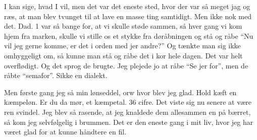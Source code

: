 \documentclass[a4paper,11pt]{article}
\begin{document}
\begin{sketch}
I kan sige, hvad I vil, men det var det eneste sted, hvor der var så
meget jag og ræs, at man blev tvunget til at lave en masse ting
samtidigt.  Men ikke nok med det.  Dad. 1 var så bange for, at vi
skulle støde sammen, så hver gang vi kom hjem fra marken, skulle vi
stille os et stykke fra døråbningen og stå og råbe "`Nu vil jeg gerne
komme, er det i orden med jer andre?"'  Og tænkte man sig ikke
omhyggeligt om, så kunne man stå og råbe det i kor hele dagen.  Det
var helt overflødigt.  Og det sprog de brugte.  Jeg plejede jo at råbe
"`Se jer for"', men de råbte "`semafor"'.  Sikke en dialekt.

Men første gang jeg så min lønseddel, orw hvor blev jeg glad.  Hold
kæft en kæmpeløn.  Er du da mør, et kæmpetal.  36 cifre.  Det viste
sig nu senere at være ren svindel.  Jeg blev så rasende, at jeg
knaldede dem allesammen en på bærret, så kom jeg selvfølgelig i
brummen.  Det er den eneste gang i mit liv, hvor jeg har været glad
for at kunne håndtere en fil.

\end{sketch}
\end{document}

